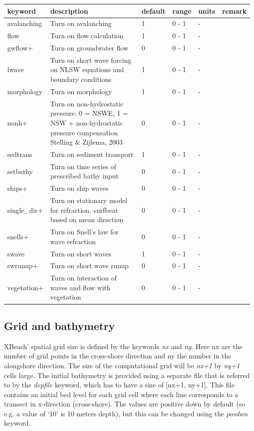 \documentclass{article}
\begin{document}
\begin{tabular}{|p{0.8in}|p{1.1in}|p{0.6in}|p{0.7in}|p{0.4in}|p{0.6in}|} \hline 
keyword & description & default & range & units & remark \\ \hline 
avalanching & Turn on avalanching & 1 & 0 - 1 & - &  \\ \hline 
flow & Turn on flow calculation & 1 & 0 - 1 & - &  \\ \hline 
gwflow+ & Turn on groundwater flow & 0 & 0 - 1 & - &  \\ \hline 
lwave & Turn on short wave forcing on NLSW equations and boundary conditions & 1 & 0 - 1 & - &  \\ \hline 
morphology & Turn on morphology & 1 & 0 - 1 & - &  \\ \hline 
nonh+ & Turn on non-hydrostatic pressure: 0 = NSWE, 1 = NSW + non-hydrostatic pressure compensation Stelling \& Zijlema, 2003 & 0 & 0 - 1 & - &  \\ \hline 
sedtrans & Turn on sediment transport & 1 & 0 - 1 & - &  \\ \hline 
setbathy & Turn on time series of prescribed bathy input & 0 & 0 - 1 & - &  \\ \hline 
ships+ & Turn on ship waves & 0 & 0 - 1 & - &  \\ \hline 
single\_dir+ & Turn on stationary model for refraction, surfbeat based on mean direction & 0 & 0 - 1 & - &  \\ \hline 
snells+ & Turn on Snell's law for wave refraction & 0 & 0 - 1 & - &  \\ \hline 
swave & Turn on short waves & 1 & 0 - 1 & - &  \\ \hline 
swrunup+ & Turn on short wave runup & 0 & 0 - 1 & - &  \\ \hline 
vegetation+ & Turn on interaction of waves and flow with vegetation & 0 & 0 - 1 & - &  \\ \hline 
\end{tabular}


\subsection{ Grid and bathymetry}

\noindent XBeach' spatial grid size is defined by the keywords \textit{nx} and \textit{ny}. Here nx are the number of grid points in the cross-shore direction and ny the number in the alongshore direction. The size of the computational grid will be \textit{nx+1} by \textit{ny+1} cells large. The initial bathymetry is provided using a separate file that is referred to by the \textit{depfile} keyword, which has to have a size of [nx+1, ny+1]. This file contains an initial bed level for each grid cell where each line corresponds to a transect in x-direction (cross-shore). The values are positive down by default (so e.g. a value of `10' is 10 meters depth), but this can be changed using the \textit{posdwn} keyword.
\end{document}
